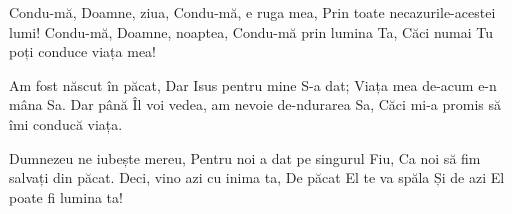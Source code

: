 \beginchorus
Condu-mă, Doamne, ziua,
Condu-mă, e ruga mea,
Prin toate necazurile-acestei lumi!
Condu-mă, Doamne, noaptea,
Condu-mă prin lumina Ta,
Căci numai Tu poți conduce viața mea!
\endchorus

\beginverse
Am fost născut în păcat,
Dar Isus pentru mine S-a dat;
Viața mea de-acum e-n mâna Sa.
Dar până Îl voi vedea, am nevoie de-ndurarea Sa,
Căci mi-a promis să îmi conducă viața.
\endverse

\beginverse
Dumnezeu ne iubește mereu,
Pentru noi a dat pe singurul Fiu,
Ca noi să fim salvați din păcat.
Deci, vino azi cu inima ta,
De păcat El te va spăla
Și de azi El poate fi lumina ta!
\endverse
\endsong